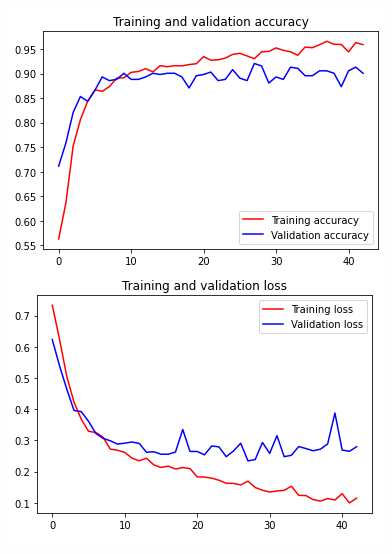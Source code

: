 \documentclass[11pt,a4paper,oneside]{article}
\begin{document}
\begin{figure}[h]
\begin{minipage}[c]{.4\textwidth}
		\includegraphics[width=.9\textwidth]{images/4.1/Siamese/AccuracyFT_drop}
	\end{minipage}
	

\end{figure}
\end{document}
